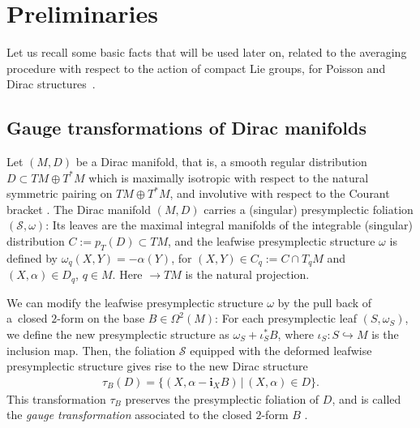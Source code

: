 \documentclass[pdftex]{sigma}
\numberwithin{equation}{section}
\begin{document}
\section{Preliminaries}

Let us recall some basic facts that will be used later on, related to the averaging procedure with respect to the action of compact Lie groups, for Poisson and Dirac structures~\cite{JVYV-14}.

\subsection{Gauge transformations of Dirac manifolds}
Let $(M,D)$ be a Dirac manifold, that is, a smooth regular distribution $D\subset TM\oplus T^{\ast}M$ which is maximally isotropic with respect to the natural symmetric pairing on $TM\oplus T^{\ast}M$, and involutive with respect to the Courant bracket \cite{Cou-90,CuWe-86}. The Dirac manifold $(M,D)$ carries a (singular) presymplectic foliation $(\mathcal{S},\omega)$: Its leaves are the maximal integral manifolds of the integrable (singular) distribution $C:=p_{T}(D)\subset TM$, and the leafwise presymplectic structure $\omega$ is def\/ined by $\omega_{q}(X,Y)=-\alpha(Y)$, for $(X,Y)\in C_{q}:=C\cap T_qM$ and $(X,\alpha)\in D_{q}$, $q\in M$. Here  $\rightarrow TM$ is the natural projection.

We can modify the leafwise presymplectic structure $\omega$ by the pull back of a~closed $2$-form on the base $B\in\Omega^{2}(M)$: For each presymplectic leaf $(S,\omega_{S})$, we def\/ine the new presymplectic structure as $\omega_{S}+\iota_{S}^{\ast}B$, where $\iota_{S}\colon S\hookrightarrow M$ is the inclusion map. Then, the foliation $\mathcal{S}$ equipped with the deformed leafwise presymplectic structure gives rise to the new Dirac structure
\begin{gather*}
\tau_{B}(D)=\{(X,\alpha-\mathbf{i}_{X}B)\,|\,(X,\alpha)\in D\}.
\end{gather*}
This transformation $\tau_{B}$ preserves the presymplectic foliation of $D$, and is called the \emph{gauge transformation} associated to the closed $2$-form $B$ \cite{BurRa-03, SeWe-01}.
\end{document}
